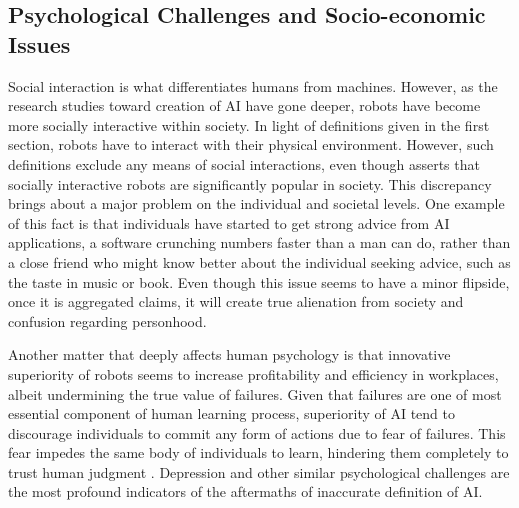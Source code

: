\documentclass[man]{apa6}
\begin{document}
\subsection{Psychological Challenges and Socio-economic Issues}
Social interaction is what differentiates humans from machines.
However, as the research studies toward creation of AI have gone deeper, robots have become more socially interactive within society.
In light of definitions given in the first section, robots have to interact with their physical environment.
However, such definitions exclude any means of social interactions, even though  asserts that socially interactive robots are significantly popular in society.
This discrepancy brings about a major problem on the individual and societal levels.
One example of this fact is that individuals have started to get strong advice from AI applications, a software crunching numbers faster than a man can do, rather than a close friend who might know better about the individual seeking advice, such as the taste in music or book.
Even though this issue seems to have a minor flipside, once it is aggregated  claims, it will create true alienation from society and confusion regarding personhood. \par
Another matter that deeply affects human psychology is that innovative superiority of robots seems to increase profitability and efficiency in workplaces, albeit undermining the true value of failures.
Given that failures are one of most essential component of human learning process, superiority of AI tend to discourage individuals to commit any form of actions due to fear of failures. 
This fear impedes the same body of individuals to learn, hindering them completely to trust human judgment .
Depression and other similar psychological challenges are the most profound indicators of the aftermaths of inaccurate definition of AI. \par
\end{document}
